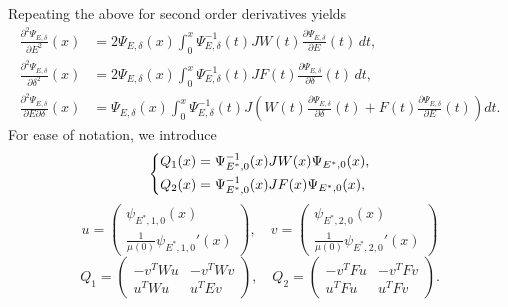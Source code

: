 Repeating the above for second order derivatives yields
\begin{align}
    \frac{\partial^2 \Psi_{E,\delta}}{\partial E^2}(x) &= 2 \Psi_{E, \delta}(x) \int_0^x \Psi_{E,\delta}^{-1}(t) J W(t) \frac{\partial \Psi_{E, \delta}}{\partial E}(t) \, dt,\\
    \frac{\partial^2 \Psi_{E,\delta}}{\partial \delta^2}(x) &= 2 \Psi_{E, \delta}(x) \int_0^x \Psi_{E,\delta}^{-1}(t) J F(t) \frac{\partial \Psi_{E, \delta}}{\partial \delta}(t) \, dt,\\
    \frac{\partial^2 \Psi_{E,\delta}}{\partial E \partial \delta}(x) &= \Psi_{E, \delta}(x) \int_0^x \Psi_{E,\delta}^{-1}(t) J \left(W(t) \frac{\partial \Psi_{E, \delta}}{\partial \delta}(t) + F(t) \frac{\partial \Psi_{E,\delta}}{\partial E}(t) \right) dt.
\end{align}
For ease of notation, we introduce 
\begin{align*}
    \begin{dcases}
    Q_1(x) = \Psi_{E^*,0}^{-1}(x) J W(x) \Psi_{E^*,0}(x),\\
    Q_2(x) = \Psi_{E^*,0}^{-1}(x) J F(x) \Psi_{E^*,0}(x),\\
    \end{dcases}
\end{align*}
%
%
%
%
\begin{equation*}
    u = \begin{pmatrix}
        \psi_{E^*,1,0}(x)\\
        \frac{1}{\mu (0)} \psi_{E^*,1,0}' (x)
    \end{pmatrix}, \quad v = \begin{pmatrix}
        \psi_{E^*,2,0}(x)\\
        \frac{1}{\mu (0)} \psi_{E^*,2,0}' (x)
    \end{pmatrix}
\end{equation*}
%
%
%
%
\begin{equation*}
    Q_1 = \begin{pmatrix}
        -v^T W u & - v^T W v\\
        u^T W u & u^T E v
    \end{pmatrix},
    \quad Q_2 = \begin{pmatrix}
        -v^T F u & -v^T F v\\
        u^T F u & u^T F v
    \end{pmatrix}.
\end{equation*}